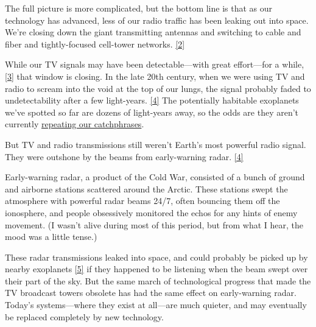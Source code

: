 {{The full picture is more complicated, but the bottom line is that as our technology has advanced, less of our radio traffic has been leaking out into space. We’re closing down the giant transmitting antennas and switching to cable and fiber and tightly-focused cell-tower networks. \href{http://arxiv.org/PS\_cache/arxiv/pdf/1007/1007.0850v1.pdf}{[2]}}

{While our TV signals may have been detectable—with great effort—for a while, \href{http://arxiv.org/pdf/astro-ph/0610377v2.pdf}{[3]} that window is closing. In the late 20th century, when we were using TV and radio to scream into the void at the top of our lungs, the signal probably faded to undetectability after a few light-years. \href{http://www.worldcat.org/title/earth-as-a-distant-planet-a-rosetta-stone-for-the-search-of-earth-like-worlds/oclc/643269627}{[4]} The potentially habitable exoplanets we’ve spotted so far are dozens of light-years away, so the odds are they aren’t currently \href{http://xkcd.com/1212/} {repeating our catchphrases}.}

{But TV and radio transmissions still weren’t Earth’s most powerful radio signal. They were outshone by the beams from early-warning radar. \href{http://www.worldcat.org/title/earth-as-a-distant-planet-a-rosetta-stone-for-the-search-of-earth-like-worlds/oclc/643269627}{[4]}}

{Early-warning radar, a product of the Cold War, consisted of a bunch of ground and airborne stations scattered around the Arctic. These stations swept the atmosphere with powerful radar beams 24/7, often bouncing them off the ionosphere, and people obsessively monitored the echos for any hints of enemy movement. (I wasn’t alive during most of this period, but from what I hear, the mood was a little tense.)}

{These radar transmissions leaked into space, and could probably be picked up by nearby exoplanets \href{http://www.astrobio.net/exclusive/4847/seti-on-the-ska}{[5]} if they happened to be listening when the beam swept over their part of the sky. But the same march of technological progress that made the TV broadcast towers obsolete has had the same effect on early-warning radar. Today’s systems—where they exist at all—are much quieter, and may eventually be replaced completely by new technology.}

}
